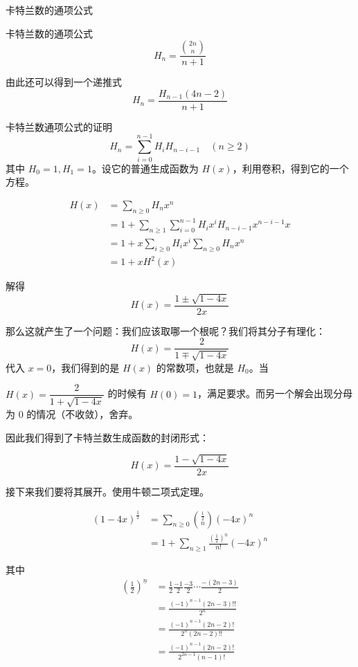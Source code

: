 \documentclass[UTF8]{beamer}
\begin{document}
    \begin{frame}{卡特兰数的通项公式}
        \begin{block}{卡特兰数的通项公式}
            \vspace{-1em}
            $$
            H_n = \frac{\binom{2n}{n}}{n+1}
            $$
            \vspace{-1em}
        \end{block}
        由此还可以得到一个递推式
        $$
        H_n=\frac{H_{n-1}(4n-2)}{n+1}
        $$
    \end{frame}

    \begin{frame}{卡特兰数通项公式的证明}
        \vspace{-1em}
$$
H_n=\sum_{i=0}^{n-1}H_{i}H_{n-i-1} \quad (n\ge 2)
$$
其中 $H_0=1,H_1=1$。设它的普通生成函数为 $H(x)$，利用卷积，得到它的一个方程。

$$
\begin{aligned}
H(x)&=\sum_{n\ge 0}H_nx^n\\
&=1+\sum_{n\ge 1}\sum_{i=0}^{n-1}H_ix^iH_{n-i-1}x^{n-i-1}x\\
&=1+x\sum_{i\ge 0}H_{i}x^i\sum_{n\ge 0}H_{n}x^{n}\\
&=1+xH^2(x)
\end{aligned}
$$

解得
$$
H(x)=\frac{1\pm \sqrt{1-4x}}{2x}
$$
\end{frame}

\begin{frame}
    
那么这就产生了一个问题：我们应该取哪一个根呢？我们将其分子有理化：
$$
H(x)=\frac{2}{1\mp \sqrt{1-4x}}
$$
代入 $x=0$，我们得到的是 $H(x)$ 的常数项，也就是 $H_0$。当 
 
$H(x)=\dfrac{2}{1+\sqrt{1-4x}}$ 的时候有 $H(0)=1$，满足要求。而另一个解会出现分母为 $0$ 的情况（不收敛），舍弃。

因此我们得到了卡特兰数生成函数的封闭形式：

$$
H(x)=\frac{1- \sqrt{1-4x}}{2x}
$$

\end{frame}

\begin{frame}
    
接下来我们要将其展开。使用牛顿二项式定理。

$$
\begin{aligned}
(1-4x)^{\frac{1}{2}}
&=\sum_{n\ge 0}\binom{\frac{1}{2}}{n}(-4x)^n\\
&=1+\sum_{n\ge 1}\frac{\left(\frac{1}{2}\right)^{\underline{n}}}{n!}(-4x)^n
\end{aligned}
$$

其中
$$
\begin{aligned}
\left(\frac{1}{2}\right)^{\underline{n}}
&=\frac{1}{2}\frac{-1}{2}\frac{-3}{2}\cdots\frac{-(2n-3)}{2}\\
&=\frac{(-1)^{n-1}(2n-3)!!}{2^n}\\
&=\frac{(-1)^{n-1}(2n-2)!}{2^n(2n-2)!!}\\
&=\frac{(-1)^{n-1}(2n-2)!}{2^{2n-1}(n-1)!}
\end{aligned}
$$
\end{frame}
\end{document}
